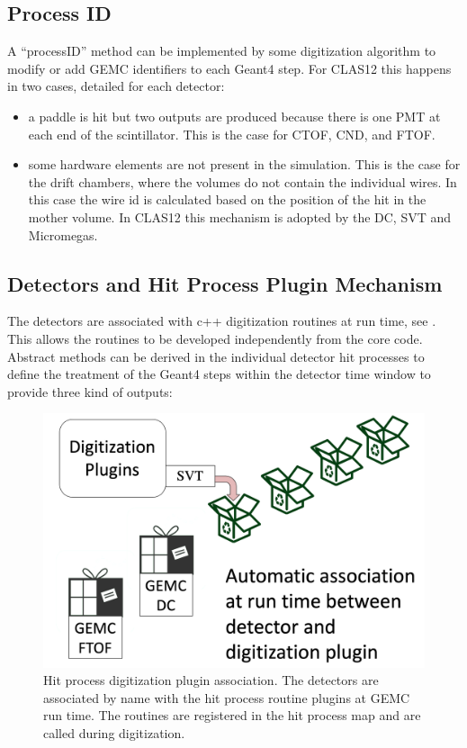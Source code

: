 \subsection{Process ID}

A ``processID'' method can be implemented by some digitization algorithm to modify or add GEMC identifiers to each Geant4 step. For CLAS12 this happens in two
cases, detailed for each detector:

\begin{itemize}
	\item a paddle is hit but two outputs are produced because there is one PMT at each end of the scintillator. This
          is the case for CTOF, CND, and FTOF.
    \item some hardware elements are not present in the simulation. This is the case for the drift chambers, where the volumes do not contain
          the individual wires. In this case the wire id is calculated based on the position of the hit in the mother volume. In CLAS12 this mechanism
          is adopted by the DC, SVT and Micromegas.
\end{itemize}


\subsection{Detectors and Hit Process Plugin Mechanism}

The detectors are associated with c++ digitization routines at run time, see .
This allows the routines to be developed independently from the core code. Abstract methods can be derived in
the individual detector hit processes to define the treatment of the Geant4 steps within the detector
time window to provide three kind of outputs:

\begin{figure}
	\centering
	\includegraphics[width=0.95\columnwidth,keepaspectratio]{img/pluginsAssociation.png}
	\caption{Hit process digitization plugin association. The detectors are associated by name with the hit process routine
             plugins at GEMC run time. The routines are registered in the hit process map and are called during digitization.}
	\label{fig:pluginsAssociation}
\end{figure}


